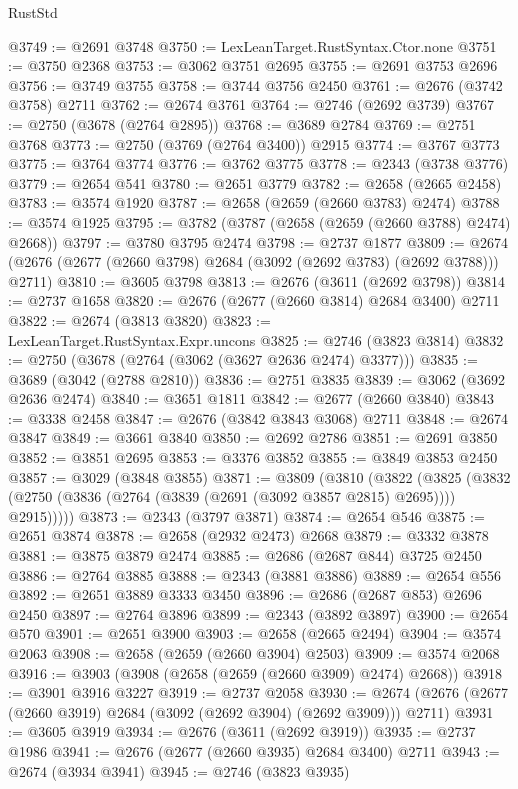 \begin{lexlean}{RustStd}
\begin{coremodule}
@3749 := @2691 @3748
@3750 := LexLeanTarget.RustSyntax.Ctor.none
@3751 := @3750 @2368
@3753 := @3062 @3751 @2695
@3755 := @2691 @3753 @2696
@3756 := @3749 @3755
@3758 := @3744 @3756 @2450
@3761 := @2676 (@3742 @3758) @2711
@3762 := @2674 @3761
@3764 := @2746 (@2692 @3739)
@3767 := @2750 (@3678 (@2764 @2895))
@3768 := @3689 @2784
@3769 := @2751 @3768
@3773 := @2750 (@3769 (@2764 @3400)) @2915
@3774 := @3767 @3773
@3775 := @3764 @3774
@3776 := @3762 @3775
@3778 := @2343 (@3738 @3776)
@3779 := @2654 @541
@3780 := @2651 @3779
@3782 := @2658 (@2665 @2458)
@3783 := @3574 @1920
@3787 := @2658 (@2659 (@2660 @3783) @2474)
@3788 := @3574 @1925
@3795 := @3782 (@3787 (@2658 (@2659 (@2660 @3788) @2474) @2668))
@3797 := @3780 @3795 @2474
@3798 := @2737 @1877
@3809 := @2674 (@2676 (@2677 (@2660 @3798) @2684 (@3092 (@2692 @3783) (@2692 @3788))) @2711)
@3810 := @3605 @3798
@3813 := @2676 (@3611 (@2692 @3798))
@3814 := @2737 @1658
@3820 := @2676 (@2677 (@2660 @3814) @2684 @3400) @2711
@3822 := @2674 (@3813 @3820)
@3823 := LexLeanTarget.RustSyntax.Expr.uncons
@3825 := @2746 (@3823 @3814)
@3832 := @2750 (@3678 (@2764 (@3062 (@3627 @2636 @2474) @3377)))
@3835 := @3689 (@3042 (@2788 @2810))
@3836 := @2751 @3835
@3839 := @3062 (@3692 @2636 @2474)
@3840 := @3651 @1811
@3842 := @2677 (@2660 @3840)
@3843 := @3338 @2458
@3847 := @2676 (@3842 @3843 @3068) @2711
@3848 := @2674 @3847
@3849 := @3661 @3840
@3850 := @2692 @2786
@3851 := @2691 @3850
@3852 := @3851 @2695
@3853 := @3376 @3852
@3855 := @3849 @3853 @2450
@3857 := @3029 (@3848 @3855)
@3871 := @3809
    (@3810
      (@3822
        (@3825 (@3832 (@2750 (@3836 (@2764 (@3839 (@2691 (@3092 @3857 @2815) @2695)))) @2915)))))
@3873 := @2343 (@3797 @3871)
@3874 := @2654 @546
@3875 := @2651 @3874
@3878 := @2658 (@2932 @2473) @2668
@3879 := @3332 @3878
@3881 := @3875 @3879 @2474
@3885 := @2686 (@2687 @844) @3725 @2450
@3886 := @2764 @3885
@3888 := @2343 (@3881 @3886)
@3889 := @2654 @556
@3892 := @2651 @3889 @3333 @3450
@3896 := @2686 (@2687 @853) @2696 @2450
@3897 := @2764 @3896
@3899 := @2343 (@3892 @3897)
@3900 := @2654 @570
@3901 := @2651 @3900
@3903 := @2658 (@2665 @2494)
@3904 := @3574 @2063
@3908 := @2658 (@2659 (@2660 @3904) @2503)
@3909 := @3574 @2068
@3916 := @3903 (@3908 (@2658 (@2659 (@2660 @3909) @2474) @2668))
@3918 := @3901 @3916 @3227
@3919 := @2737 @2058
@3930 := @2674 (@2676 (@2677 (@2660 @3919) @2684 (@3092 (@2692 @3904) (@2692 @3909))) @2711)
@3931 := @3605 @3919
@3934 := @2676 (@3611 (@2692 @3919))
@3935 := @2737 @1986
@3941 := @2676 (@2677 (@2660 @3935) @2684 @3400) @2711
@3943 := @2674 (@3934 @3941)
@3945 := @2746 (@3823 @3935)

\end{coremodule}
\end{lexlean}
